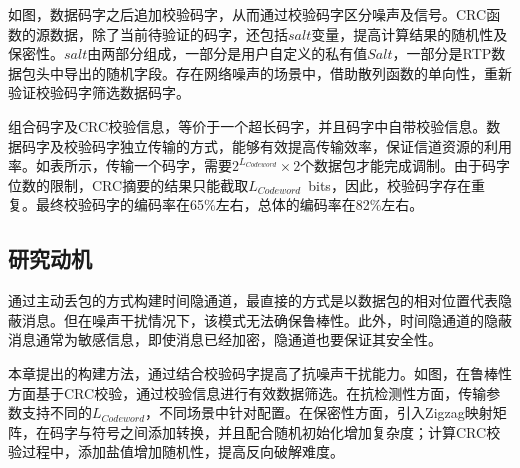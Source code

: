 如图，数据码字之后追加校验码字，从而通过校验码字区分噪声及信号。CRC函数的源数据，除了当前待验证的码字，还包括$salt$变量，提高计算结果的随机性及保密性。$salt$由两部分组成，一部分是用户自定义的私有值$Salt$，一部分是RTP数据包头中导出的随机字段。存在网络噪声的场景中，借助散列函数的单向性，重新验证校验码字筛选数据码字。


组合码字及CRC校验信息，等价于一个超长码字，并且码字中自带校验信息。数据码字及校验码字独立传输的方式，能够有效提高传输效率，保证信道资源的利用率。如表所示，传输一个码字，需要$2^{L_{Codeword}}\times 2$个数据包才能完成调制。由于码字位数的限制，CRC摘要的结果只能截取{$L_{Codeword}$\ bits}，因此，校验码字存在重复。最终校验码字的编码率在65\%左右，总体的编码率在82\%左右。

\subsection{研究动机}
\label{chap:zigzag:motivation:conclude}
通过主动丢包的方式构建时间隐通道，最直接的方式是以数据包的相对位置代表隐蔽消息。但在噪声干扰情况下，该模式无法确保鲁棒性。此外，时间隐通道的隐蔽消息通常为敏感信息，即使消息已经加密，隐通道也要保证其安全性。


本章提出的构建方法，通过结合校验码字提高了抗噪声干扰能力。如图，在鲁棒性方面基于CRC校验，通过校验信息进行有效数据筛选。在抗检测性方面，传输参数支持不同的$L_{Codeword}$，不同场景中针对配置。在保密性方面，引入Zigzag映射矩阵，在码字与符号之间添加转换，并且配合随机初始化增加复杂度；计算CRC校验过程中，添加盐值增加随机性，提高反向破解难度。